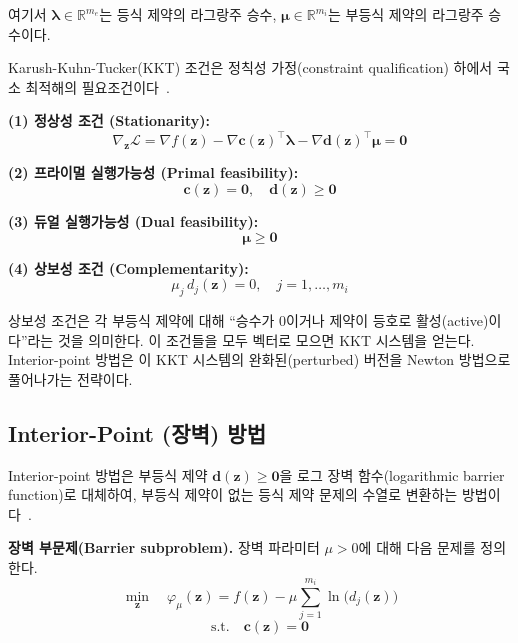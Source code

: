 \documentclass[11pt]{article}
\begin{document}
여기서 $\boldsymbol{\lambda} \in \mathbb{R}^{m_e}$는 등식 제약의 라그랑주 승수, $\boldsymbol{\mu} \in \mathbb{R}^{m_i}$는 부등식 제약의 라그랑주 승수이다.

Karush-Kuhn-Tucker(KKT) 조건은 정칙성 가정(constraint qualification) 하에서 국소 최적해의 필요조건이다~\cite{Nocedal2006}.

\textbf{(1) 정상성 조건 (Stationarity):}
%
\begin{equation}\label{eq:kkt-stationarity}
\nabla_{\mathbf{z}} \mathcal{L} = \nabla f(\mathbf{z}) - \nabla \mathbf{c}(\mathbf{z})^\top \boldsymbol{\lambda} - \nabla \mathbf{d}(\mathbf{z})^\top \boldsymbol{\mu} = \mathbf{0}
\end{equation}

\textbf{(2) 프라이멀 실행가능성 (Primal feasibility):}
%
\begin{equation}\label{eq:kkt-primal}
\mathbf{c}(\mathbf{z}) = \mathbf{0}, \quad \mathbf{d}(\mathbf{z}) \geq \mathbf{0}
\end{equation}

\textbf{(3) 듀얼 실행가능성 (Dual feasibility):}
%
\begin{equation}\label{eq:kkt-dual}
\boldsymbol{\mu} \geq \mathbf{0}
\end{equation}

\textbf{(4) 상보성 조건 (Complementarity):}
%
\begin{equation}\label{eq:kkt-complementarity}
\mu_j \, d_j(\mathbf{z}) = 0, \quad j = 1, \ldots, m_i
\end{equation}

상보성 조건은 각 부등식 제약에 대해 ``승수가 0이거나 제약이 등호로 활성(active)이다''라는 것을 의미한다. 이 조건들을 모두 벡터로 모으면 KKT 시스템을 얻는다. Interior-point 방법은 이 KKT 시스템의 완화된(perturbed) 버전을 Newton 방법으로 풀어나가는 전략이다.

\subsection{Interior-Point (장벽) 방법}

Interior-point 방법은 부등식 제약 $\mathbf{d}(\mathbf{z}) \geq \mathbf{0}$을 로그 장벽 함수(logarithmic barrier function)로 대체하여, 부등식 제약이 없는 등식 제약 문제의 수열로 변환하는 방법이다~\cite{Fiacco1968, Wachter2006}.

\textbf{장벽 부문제(Barrier subproblem).} 장벽 파라미터 $\mu > 0$에 대해 다음 문제를 정의한다.
%
\begin{equation}\label{eq:barrier-obj}
\min_{\mathbf{z}} \quad \varphi_\mu(\mathbf{z}) = f(\mathbf{z}) - \mu \sum_{j=1}^{m_i} \ln\bigl(d_j(\mathbf{z})\bigr)
\end{equation}
%
\[
\text{s.t.} \quad \mathbf{c}(\mathbf{z}) = \mathbf{0}
\]
\end{document}
